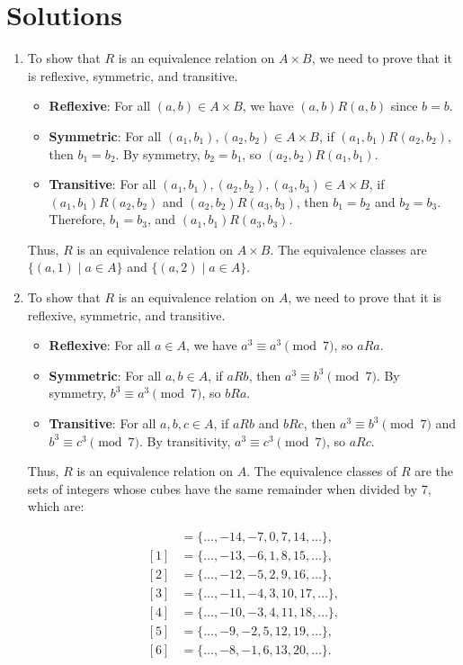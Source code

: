 
\section*{Solutions}

\begin{enumerate}
\item
To show that $R$ is an equivalence relation on $A \times B$, we need to prove that it is reflexive, symmetric, and transitive.

\begin{itemize}
\item \textbf{Reflexive}: For all $(a, b) \in A \times B$, we have $(a, b)R(a, b)$ since $b = b$.
\item \textbf{Symmetric}: For all $(a_1, b_1), (a_2, b_2) \in A \times B$, if $(a_1, b_1)R(a_2, b_2)$, then $b_1 = b_2$. By symmetry, $b_2 = b_1$, so $(a_2, b_2)R(a_1, b_1)$.
\item \textbf{Transitive}: For all $(a_1, b_1), (a_2, b_2), (a_3, b_3) \in A \times B$, if $(a_1, b_1)R(a_2, b_2)$ and $(a_2, b_2)R(a_3, b_3)$, then $b_1 = b_2$ and $b_2 = b_3$. Therefore, $b_1 = b_3$, and $(a_1, b_1)R(a_3, b_3)$.
\end{itemize}

Thus, $R$ is an equivalence relation on $A \times B$. The equivalence classes are $\{(a, 1) \mid a \in A\}$ and $\{(a, 2) \mid a \in A\}$.

\item
To show that $R$ is an equivalence relation on $A$, we need to prove that it is reflexive, symmetric, and transitive.

\begin{itemize}
\item \textbf{Reflexive}: For all $a \in A$, we have $a^3 \equiv a^3 \pmod{7}$, so $aRa$.
\item \textbf{Symmetric}: For all $a, b \in A$, if $aRb$, then $a^3 \equiv b^3 \pmod{7}$. By symmetry, $b^3 \equiv a^3 \pmod{7}$, so $bRa$.
\item \textbf{Transitive}: For all $a, b, c \in A$, if $aRb$ and $bRc$, then $a^3 \equiv b^3 \pmod{7}$ and $b^3 \equiv c^3 \pmod{7}$. By transitivity, $a^3 \equiv c^3 \pmod{7}$, so $aRc$.
\end{itemize}

Thus, $R$ is an equivalence relation on $A$. The equivalence classes of $R$ are the sets of integers whose cubes have the same remainder when divided by 7, which are:

\begin{align*}
[0] &= \{\dots, -14, -7, 0, 7, 14, \dots\}, \\
[1] &= \{\dots, -13, -6, 1, 8, 15, \dots\}, \\
[2] &= \{\dots, -12, -5, 2, 9, 16, \dots\}, \\
[3] &= \{\dots, -11, -4, 3, 10, 17, \dots\}, \\
[4] &= \{\dots, -10, -3, 4, 11, 18, \dots\}, \\
[5] &= \{\dots, -9, -2, 5, 12, 19, \dots\}, \\
[6] &= \{\dots, -8, -1, 6, 13, 20, \dots\}.
\end{align*}


\end{enumerate}
